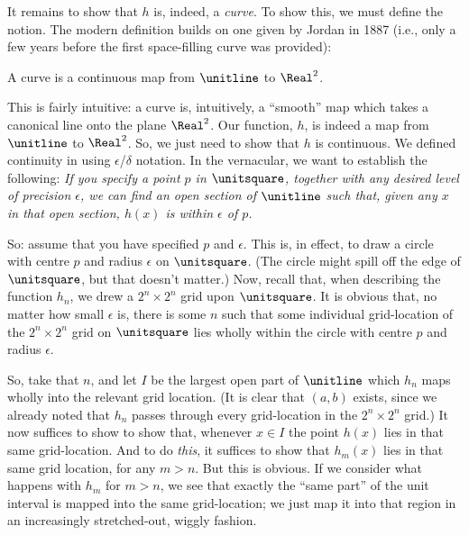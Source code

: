 \documentclass[../../../include/open-logic-section]{subfiles}
\begin{document}
It remains to show that $h$ is, indeed, a \emph{curve}. To show this,
we must define the notion. The modern definition builds on one given
by Jordan in 1887 (i.e., only a few years before the first
space-filling curve was provided): 

\begin{defn}
A curve is a continuous map from $\unitline$ to $\Real^2$. 
\end{defn}

This is fairly intuitive: a curve is, intuitively, a ``smooth'' map
which takes a canonical line onto the plane $\Real^2$. Our function,
$h$, is indeed a map from $\unitline$ to $\Real^2$. So, we just need
to show that $h$ is continuous. We defined continuity in
 using $\epsilon$/$\delta$ notation. In the
vernacular, we want to establish the following: \emph{If you specify a
point $p$ in $\unitsquare$, together with any desired level of
precision $\epsilon$, we can find an open section of $\unitline$ such
that, given any $x$ in that open section, $h(x)$ is within $\epsilon$
of $p$.}

So: assume that you have specified $p$ and $\epsilon$. This is, in
effect, to draw a circle with centre $p$ and radius $\epsilon$ on
$\unitsquare$. (The circle might spill off the edge of $\unitsquare$,
but that doesn't matter.) Now, recall that, when describing the
function $h_n$, we drew a $2^n \times 2^n$ grid upon $\unitsquare$. It
is obvious that, no matter how small $\epsilon$ is, there is some $n$
such that some individual grid-location of the $2^n \times 2^n$ grid
on $\unitsquare$ lies wholly within the circle with centre $p$ and
radius $\epsilon$. 

So, take that $n$, and let $I$ be the largest open part of $\unitline$
which $h_n$ maps wholly into the relevant grid location. (It is clear
that $(a,b)$ exists, since we already noted that $h_n$ passes through
every grid-location in the $2^n\times 2^n$ grid.) It now suffices to
show to show that, whenever $x \in I$ the point $h(x)$ lies in that
same grid-location. And to do \emph{this}, it suffices to show that
$h_m(x)$ lies in that same grid location, for any $m > n$. But this is
obvious. If we consider what happens with $h_m$ for $m > n$, we see
that exactly the ``same part'' of the unit interval is mapped
into the same grid-location; we just map it into that region in an
increasingly stretched-out, wiggly fashion. 
\end{document}
